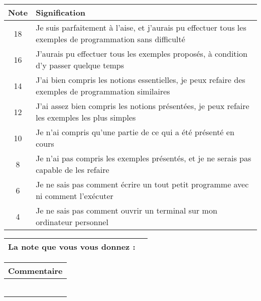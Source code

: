 \documentclass[12pt]{article}
\begin{document}
\begin{center}
\begin{tabular}{| c | p{12cm} |}
\hline
Note & Signification\\
\hline
18 & Je suis parfaitement à l'aise, et j'aurais pu effectuer tous les exemples de programmation sans difficulté\\
\hline
16 & J'aurais pu effectuer tous les exemples proposés, à condition d'y passer quelque
temps\\
\hline
14 & J'ai bien compris les notions essentielles, je peux refaire des exemples de programmation
similaires\\
\hline
12 & J'ai assez bien compris les notions présentées, je peux refaire les exem\-ples les plus
simples\\
\hline
10 & Je n'ai compris qu'une partie de ce qui a été présenté en cours\\
\hline
8 & Je n'ai pas compris les exemples présentés, et je ne serais pas capable
de les refaire\\
\hline
6 & Je ne sais pas comment écrire un tout petit programme avec \pyth{} ni
comment l'exécuter\\
\hline
4 & Je ne sais pas comment ouvrir un terminal sur mon ordinateur personnel\\
\hline
\end{tabular}
\end{center}

\begin{center}
\begin{tabular}{| p{7cm} | p{1cm} |}
\hline
La note que vous vous donnez : & \\
\hline
\end{tabular}
\end{center}

\begin{center}
\begin{tabular}{| p{14cm} |}
\hline
Commentaire\\
\hline
~\\
\vspace{3cm}
\\
\hline
\end{tabular}
\end{center}
\end{document}
